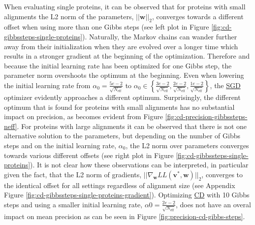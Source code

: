 \documentclass[11pt,a4paper,twoside]{book}
\renewcommand{\v}{\mathbf{v}}
\newcommand{\w}{\mathbf{w}}
\theoremstyle{definition}
\theoremstyle{definition}
\theoremstyle{remark}
\begin{document}
When evaluating single proteins, it can be observed that for proteins
with small alignments the L2 norm of the parameters, \(||\w||_2\),
converges towards a different offset when using more than one Gibbs
steps (see left plot in Figure \ref{fig:cd-gibbssteps-single-proteins}).
Naturally, the Markov chains can wander further away from their
initialization when they are evolved over a longer time which results in
a stronger gradient at the beginning of the optimization. Therefore and
because the initial learning rate has been optimized for one Gibbs step,
the parameter norm overshoots the optimum at the beginning. Even when
lowering the initial learning rate from
\(\alpha_0 = \frac{5e-2}{\sqrt{N_{\text{eff}}}}\) to
\(\alpha_0 \in \left \{ \frac{3e-2}{\sqrt{N_{\text{eff}}}}, \frac{2e-2}{\sqrt{N_{\text{eff}}}} , \frac{1e-2}{\sqrt{N_{\text{eff}}}} \right \}\),
the \protect\hyperlink{abbrev}{SGD} optimizer evidently approaches a
different optimum. Surprisingly, the different optimum that is found for
proteins with small alignments has no substantial impact on precision,
as becomes evident from Figure \ref{fig:cd-precision-gibbssteps-neff}.
For proteins with large alignments it can be observed that there is not
one alternative solution to the parameters, but depending on the number
of Gibbs steps and on the initial learning rate, \(\alpha_0\), the L2
norm over parameters converges towards various different offsets (see
right plot in Figure \ref{fig:cd-gibbssteps-single-proteins}). It is not
clear how these observations can be interpreted, in particular given the
fact, that the L2 norm of gradients,
\(||\nabla_{\w} L\!L(\v^*, \w)||_2\), converges to the identical offset
for all settings regardless of alignment size (see Appendix Figure
\ref{fig:cd-gibbssteps-single-proteins-gradient}). Optimizing
\protect\hyperlink{abbrev}{CD} with 10 Gibbs steps and using a smaller
initial learning rate, \(\alpha0 = \frac{2e-2}{\sqrt{N_{\text{eff}}}}\),
does not have an overal impact on mean precision as can be seen in
Figure \ref{fig:precision-cd-gibbs-steps}.
\end{document}

